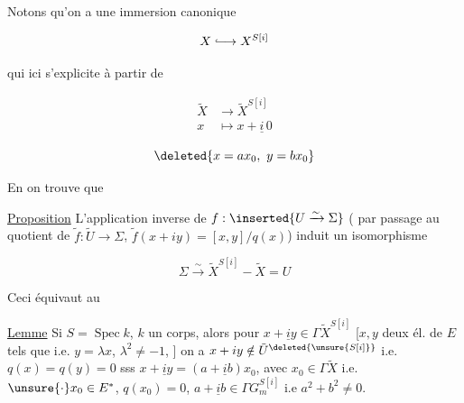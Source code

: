 
Notons qu'on a une immersion canonique

\[
X\lhook\joinrel\longrightarrow X^{S[i]}
\]

qui ici s'explicite à partir de

\[
\begin{aligned}\tilde X&\longrightarrow\tilde X^{S[i]}\\ x&\longmapsto x+\underline i\,0\end{aligned}
\]


\[
\deleted{x=ax_0,\ y=bx_0}
\]

En  on trouve que

\uline{Proposition} L'application inverse de $f:\inserted{U\xrightarrow{\sim}\Sigma}$ ( par passage au quotient de $\tilde f:\tilde U\to\Sigma$, $\tilde f(x+iy)=[x,y]/q(x)$) induit un isomorphisme

\[
\boxed{\Sigma\xrightarrow{\sim}\tilde X^{S[i]}-\tilde X=U}
\]

Ceci équivaut au 

\uline{Lemme} Si $S=\operatorname{Spec} k$, $k$ un corps,  alors pour  $x+\underline i y\in\Gamma\tilde X^{S[i]}$ [$x,y$ deux él. de $E$  tels que    i.e. $y=\lambda x$,   $\lambda^2\ne-1$, ]  \unsure{;|,} on a $x+iy\notin\tilde U^{\deleted{\unsure{S[i]}}}$ i.e. $q(x)=q(y)=0$ sss $x+\underline i y=(a+\underline i b)x_0$, avec $x_0\in\Gamma\tilde X$ i.e. $\unsure{\cdot}x_0\in E^{*}$, $q(x_0)=0$,  $a+\underline i b\in\Gamma G_m^{S[i]}$ i.e $a^2+b^2\ne0$.

